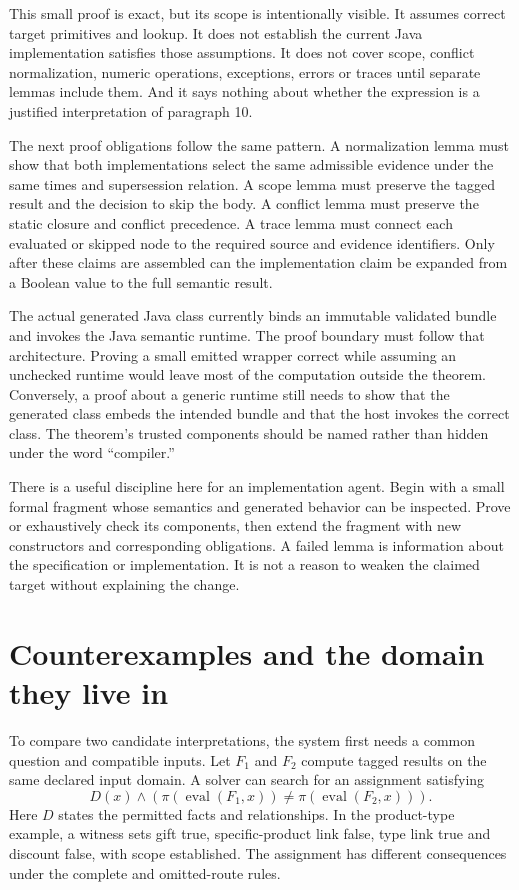 \documentclass[12pt,a4paper,oneside,openany]{book}
\newcommand{\eval}{\operatorname{eval}}
\begin{document}
This small proof is exact, but its scope is intentionally visible. It assumes
correct target primitives and lookup. It does not establish the current Java
implementation satisfies those assumptions. It does not cover scope, conflict
normalization, numeric operations, exceptions, errors or traces until separate
lemmas include them. And it says nothing about whether the expression is a
justified interpretation of paragraph 10.

The next proof obligations follow the same pattern. A normalization lemma must
show that both implementations select the same admissible evidence under the
same times and supersession relation. A scope lemma must preserve the tagged
result and the decision to skip the body. A conflict lemma must preserve the
static closure and conflict precedence. A trace lemma must connect each
evaluated or skipped node to the required source and evidence identifiers.
Only after these claims are assembled can the implementation claim be expanded
from a Boolean value to the full semantic result.

The actual generated Java class currently binds an immutable validated bundle
and invokes the Java semantic runtime. The proof boundary must follow that
architecture. Proving a small emitted wrapper correct while assuming an
unchecked runtime would leave most of the computation outside the theorem.
Conversely, a proof about a generic runtime still needs to show that the
generated class embeds the intended bundle and that the host invokes the
correct class. The theorem's trusted components should be named rather than
hidden under the word ``compiler.''

There is a useful discipline here for an implementation agent. Begin with a
small formal fragment whose semantics and generated behavior can be inspected.
Prove or exhaustively check its components, then extend the fragment with new
constructors and corresponding obligations. A failed lemma is information
about the specification or implementation. It is not a reason to weaken the
claimed target without explaining the change.

\section{Counterexamples and the domain they live in}
\label{sec:proof-counterexamples}
To compare two candidate interpretations, the system first needs a common
question and compatible inputs. Let $F_1$ and $F_2$ compute tagged results on
the same declared input domain. A solver can search for an assignment satisfying
\begin{equation}
 D(x)\land\left(\pi(\eval(F_1,x))\ne
                         \pi(\eval(F_2,x))\right).
 \label{eq:difference-query}
\end{equation}
Here $D$ states the permitted facts and relationships. In the product-type
example, a witness sets gift true, specific-product link false, type link true
and discount false, with scope established. The assignment has different
consequences under the complete and omitted-route rules.
\end{document}
